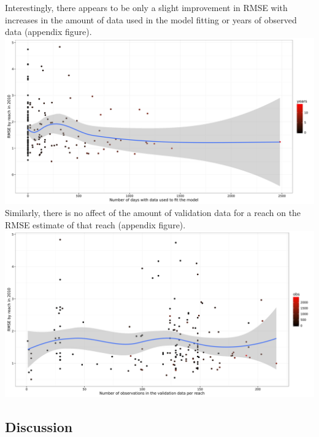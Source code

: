 \documentclass[]{article}
\begin{document}
Interestingly, there appears to be only a slight improvement in RMSE
with increases in the amount of data used in the model fitting or years
of observed data (appendix figure).
\includegraphics{Figures/rmse_2010_obs_plot.jpg} Similarly, there is no
affect of the amount of validation data for a reach on the RMSE estimate
of that reach (appendix figure).
\includegraphics{Figures/rmse_2010_valid_obs_plot.jpg}

\subsection{Discussion}\label{discussion}
\end{document}

